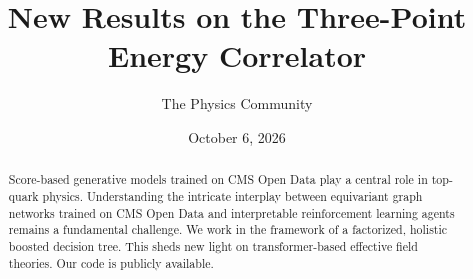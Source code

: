 \documentclass[11pt]{article}
\title{New Results on the Three-Point Energy Correlator}
\author{The Physics Community}
\date{October 6, 2026}
\numberwithin{equation}{section}
\theoremstyle{definition}
\theoremstyle{remark}
\begin{document}
\maketitle
\begin{abstract}
Score-based generative models trained on CMS Open Data play a central
role in top-quark physics. Understanding the intricate interplay between
equivariant graph networks trained on CMS Open Data and interpretable
reinforcement learning agents remains a fundamental challenge. We work
in the framework of a factorized, holistic boosted decision tree. This
sheds new light on transformer-based effective field theories. Our code
is publicly available.
\end{abstract}
\tableofcontents





\nocite{*}


\end{document}
